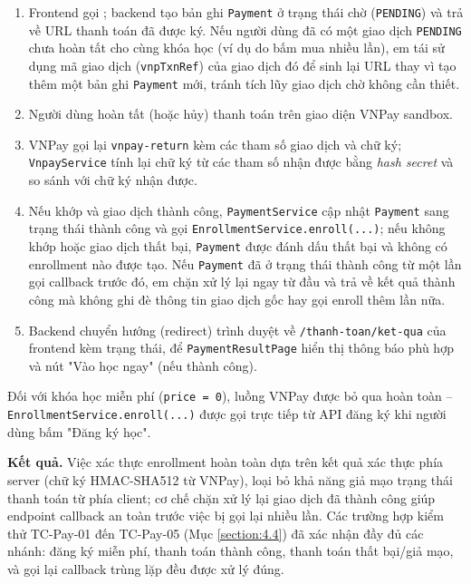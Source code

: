 \documentclass[../DoAn.tex]{subfiles}
\begin{document}
\begin{enumerate}
    \item Frontend gọi \texttt{}; backend tạo bản ghi \texttt{Payment} ở trạng thái chờ (\texttt{PENDING}) và trả về URL thanh toán đã được ký. Nếu người dùng đã có một giao dịch \texttt{PENDING} chưa hoàn tất cho cùng khóa học (ví dụ do bấm mua nhiều lần), em tái sử dụng mã giao dịch (\texttt{vnpTxnRef}) của giao dịch đó để sinh lại URL thay vì tạo thêm một bản ghi \texttt{Payment} mới, tránh tích lũy giao dịch chờ không cần thiết.
    \item Người dùng hoàn tất (hoặc hủy) thanh toán trên giao diện VNPay sandbox.
    \item VNPay gọi lại \texttt{vnpay-return} kèm các tham số giao dịch và chữ ký; \texttt{VnpayService} tính lại chữ ký từ các tham số nhận được bằng \textit{hash secret} và so sánh với chữ ký nhận được.
    \item Nếu khớp và giao dịch thành công, \texttt{PaymentService} cập nhật \texttt{Payment} sang trạng thái thành công và gọi \texttt{EnrollmentService.enroll(...)}; nếu không khớp hoặc giao dịch thất bại, \texttt{Payment} được đánh dấu thất bại và không có enrollment nào được tạo. Nếu \texttt{Payment} đã ở trạng thái thành công từ một lần gọi callback trước đó, em chặn xử lý lại ngay từ đầu và trả về kết quả thành công mà không ghi đè thông tin giao dịch gốc hay gọi enroll thêm lần nữa.
    \item Backend chuyển hướng (redirect) trình duyệt về \texttt{/thanh-toan/ket-qua} của frontend kèm trạng thái, để \texttt{PaymentResultPage} hiển thị thông báo phù hợp và nút "Vào học ngay" (nếu thành công).
\end{enumerate}

Đối với khóa học miễn phí (\texttt{price = 0}), luồng VNPay được bỏ qua hoàn toàn -- \texttt{EnrollmentService.enroll(...)} được gọi trực tiếp từ API đăng ký khi người dùng bấm "Đăng ký học".

\textbf{Kết quả.} Việc xác thực enrollment hoàn toàn dựa trên kết quả xác thực phía server (chữ ký HMAC-SHA512 từ VNPay), loại bỏ khả năng giả mạo trạng thái thanh toán từ phía client; cơ chế chặn xử lý lại giao dịch đã thành công giúp endpoint callback an toàn trước việc bị gọi lại nhiều lần. Các trường hợp kiểm thử TC-Pay-01 đến TC-Pay-05 (Mục \ref{section:4.4}) đã xác nhận đầy đủ các nhánh: đăng ký miễn phí, thanh toán thành công, thanh toán thất bại/giả mạo, và gọi lại callback trùng lặp đều được xử lý đúng.
\end{document}
